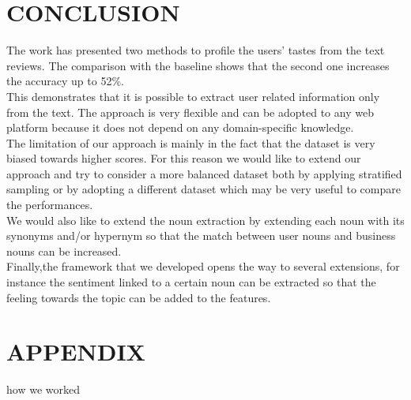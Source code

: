\documentclass[11pt]{article}
\begin{document}
\section{CONCLUSION}
The work has presented two methods to profile the users' tastes from the text reviews. The comparison with the baseline shows that the second one increases the accuracy up to 52\%.\\
This demonstrates that it is possible to extract user related information only from the text. The approach is very flexible and can be adopted to any web platform because it does not depend on any domain-specific knowledge.\\
The limitation of our approach is mainly in the fact that the dataset is very biased towards higher scores. For this reason we would like to extend our approach and try to consider a more balanced dataset both by applying stratified sampling or by adopting a different dataset which may be very useful to compare the performances.\\
We would also like to extend the noun extraction by extending each noun with its synonyms and/or hypernym so that the match between user nouns and business nouns can be increased.\\
Finally,the framework that we developed opens the way to several extensions, for instance the sentiment linked to a certain noun can be extracted so that the feeling towards the topic can be added to the features.\\




\addtolength{\textheight}{-12cm}   %







\newpage
\section*{APPENDIX}
how we worked
\end{document}
